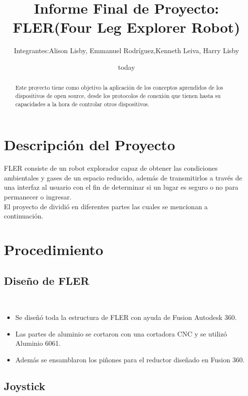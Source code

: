 \documentclass[12pt,letterpaper]{IEEEtran}
\title{Informe Final de Proyecto: FLER(Four Leg Explorer Robot) }
\author{Integrantes:Alison Lisby, Emmanuel Rodríguez,Kenneth Leiva, Harry Lisby}
\date {today}
\begin{document}
\maketitle 
\renewcommand{\leftmark}{UNIVERSIDAD LATINA DE COSTA RICA -- BINGE-61 Microcontroladores}

\begin{abstract}
Este proyecto tiene como objetivo la aplicación de los conceptos aprendidos de los dispositivos de open source, desde  los protocolos de conexión que tienen hasta su capacidades a la hora de controlar otros dispositivos.
		
\end{abstract}

\section{Descripción del Proyecto }

FLER consiste de un robot explorador capaz de obtener las condiciones ambientales y gases de un espacio reducido, además de transmitirlos a través de una interfaz al usuario con el fin de determinar si un lugar es seguro o no para permanecer o ingresar.\\

El proyecto de dividió en diferentes partes las cuales se mencionan a continuación.

\section{Procedimiento}

\subsection{Diseño de FLER}\

\begin{itemize}
	\item Se diseñó toda la estructura de FLER con ayuda de Fusion Autodesk 360.
	\item Las partes de aluminio se cortaron con una cortadora CNC y se utilizó Aluminio 6061.
	\item Además se ensamblaron los piñones para el reductor diseñado en Fusion 360.
\end{itemize}

\subsection{Joystick}\
\end{document}
